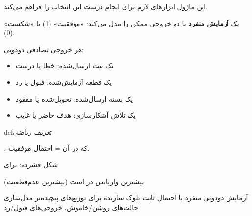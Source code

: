 این ماژول ابزارهای لازم برای انجام درست این انتخاب را فراهم می‌کند.



یک \textbf{آزمایش منفرد} با دو خروجی ممکن را مدل می‌کند: «موفقیت» (1) یا «شکست» (0).


هر خروجی تصادفی دودویی:

\begin{itemize}
\tightlist
\item
  یک بیت ارسال‌شده: خطا یا درست
\item
  یک قطعه آزمایش‌شده: قبول یا رد
\item
  یک بسته ارسال‌شده: تحویل‌شده یا مفقود
\item
  یک تلاش آشکارسازی: هدف حاضر یا غایب
\end{itemize}

\begin{PSbox}[unbreakable]{def}{تعریف ریاضی}

، که در آن  = احتمال موفقیت.

\end{PSbox}



شکل فشرده:  برای 







بیشترین واریانس در  است (بیشترین عدم‌قطعیت).


\lr{\mbox{\PSyes{}}} آزمایش دودویی منفرد با احتمال ثابت\PSbr{}\lr{\mbox{\PSyes{}}} بلوک سازنده برای توزیع‌های پیچیده‌تر\PSbr{}\lr{\mbox{\PSyes{}}} مدل‌سازی حالت‌های روشن/خاموش، خروجی‌های قبول/رد

